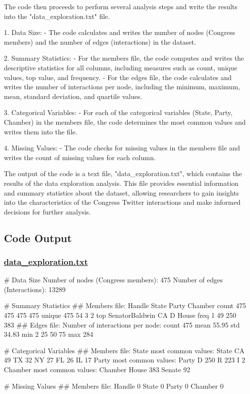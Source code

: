 \documentclass[11pt]{article}
\begin{document}
The code then proceeds to perform several analysis steps and write the results into the "data\_exploration.txt" file.

1. Data Size:
   - The code calculates and writes the number of nodes (Congress members) and the number of edges (interactions) in the dataset.

2. Summary Statistics:
   - For the members file, the code computes and writes the descriptive statistics for all columns, including measures such as count, unique values, top value, and frequency.
   - For the edges file, the code calculates and writes the number of interactions per node, including the minimum, maximum, mean, standard deviation, and quartile values.

3. Categorical Variables:
   - For each of the categorical variables (State, Party, Chamber) in the members file, the code determines the most common values and writes them into the file.

4. Missing Values:
   - The code checks for missing values in the members file and writes the count of missing values for each column.

The output of the code is a text file, "data\_exploration.txt", which contains the results of the data exploration analysis. This file provides essential information and summary statistics about the dataset, allowing researchers to gain insights into the characteristics of the Congress Twitter interactions and make informed decisions for further analysis.

\subsection{Code Output}\hypertarget{file-data-exploration-txt}{}

\subsubsection*{\hyperlink{code-Data Exploration-data-exploration-txt}{data\_exploration.txt}}

\begin{codeoutput}
# Data Size
Number of nodes (Congress members): 475
Number of edges (Interactions): 13289

# Summary Statistics
## Members file:
                Handle State Party Chamber
count              475   475   475     475
unique             475    54     3       2
top     SenatorBaldwin    CA     D   House
freq                 1    49   250     383
## Edges file:
Number of interactions per node:
count     475
mean    55.95
std     34.83
min         2
25%
50%
75%
max       284

# Categorical Variables
## Members file:
State most common values:
State
CA    49
TX    32
NY    27
FL    26
IL    17
Party most common values:
Party
D    250
R    223
I      2
Chamber most common values:
Chamber
House     383
Senate     92

# Missing Values
## Members file:
Handle     0
State      0
Party      0
Chamber    0


\end{codeoutput}
\end{document}
